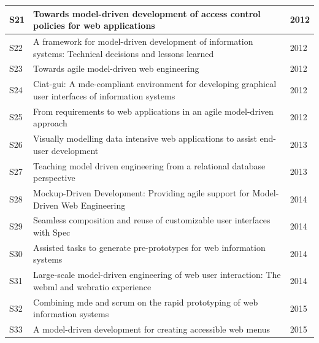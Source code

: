 \begin{table}[ht!]
\begin{tabular}{ | p{0.3cm} | p{6.2cm} | p{0.7cm}|}
S21 &  Towards model-driven development of access control policies for web applications~\cite{Busch12}   & 2012 \\ \hline

S22 &  A framework for model-driven development of information systems: Technical decisions and lessons learned~\cite{Vara12}  &  2012 \\ \hline

S23 &  Towards agile model-driven  web  engineering~\cite{Rivero12}  & 2012 \\ \hline

S24 & Ciat-gui:  A  mde-compliant  environment  for  developing  graphical  user interfaces of information systems~\cite{Molina12}  & 2012 \\ \hline

S25 &  From requirements to web applications in an agile model-driven approach~\cite{Grigera12}  &  2012 \\ \hline

S26 &  Visually modelling data intensive web applications to assist end-user development~\cite{Deufemia13}  &  2013 \\ \hline

S27 &  Teaching model driven engineering from a relational database perspective~\cite{Batory13MODELS}  & 2013 \\ \hline

S28 &  Mockup-Driven Development: Providing agile support for Model-Driven Web Engineering~\cite{Rivero2014}  & 2014\\ \hline


S29 &  Seamless composition and reuse of customizable user interfaces with Spec~\cite{VANRYSEGHEM201434}	 & 2014 \\ \hline

S30 &  Assisted tasks to generate pre-prototypes for web information systems~\cite{Basso14ICEISb}  & 2014 \\ \hline

S31 &  Large-scale model-driven engineering of web user interaction: The webml and webratio experience~\cite{Brambilla14}  & 2014 \\ \hline

S32 &  Combining mde and scrum on the rapid prototyping of web information systems~\cite{Basso15IJWET}  &  2015  \\ \hline

S33 &  A model-driven development for creating accessible web menus~\cite{antonelli2015model}  & 2015 \\ \hline


\end{tabular}
\end{table}
